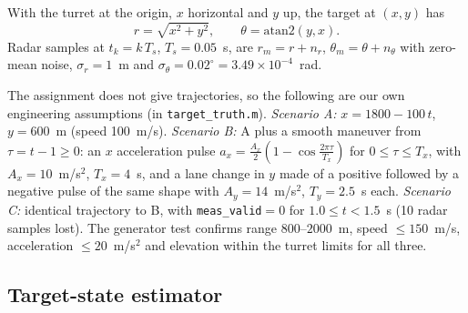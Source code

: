 \documentclass[conference]{IEEEtran}
\begin{document}
With the turret at the origin, $x$ horizontal and $y$ up, the target at $(x,y)$ has
\begin{equation}
r=\sqrt{x^2+y^2},\qquad \theta=\mathrm{atan2}(y,x).
\end{equation}
Radar samples at $t_k = k\,T_s$, $T_s=0.05$~s, are $r_m=r+n_r$, $\theta_m=\theta+n_\theta$ with zero-mean noise, $\sigma_r=1$~m and $\sigma_\theta=0.02^\circ=3.49\times10^{-4}$~rad.

The assignment does not give trajectories, so the following are our own engineering assumptions (in \texttt{target\_truth.m}). \emph{Scenario A:} $x=1800-100\,t$, $y=600$~m (speed 100~m/s). \emph{Scenario B:} A plus a smooth maneuver from $\tau=t-1\ge0$: an $x$ acceleration pulse $a_x=\tfrac{A_x}{2}\left(1-\cos\tfrac{2\pi\tau}{T_x}\right)$ for $0\le\tau\le T_x$, with $A_x=10$~m/s$^2$, $T_x=4$~s, and a lane change in $y$ made of a positive followed by a negative pulse of the same shape with $A_y=14$~m/s$^2$, $T_y=2.5$~s each. \emph{Scenario C:} identical trajectory to B, with \texttt{meas\_valid}$=0$ for $1.0\le t<1.5$~s (10 radar samples lost). The generator test confirms range $800$--$2000$~m, speed $\le150$~m/s, acceleration $\le20$~m/s$^2$ and elevation within the turret limits for all three.

\subsection{Target-state estimator}
\end{document}
